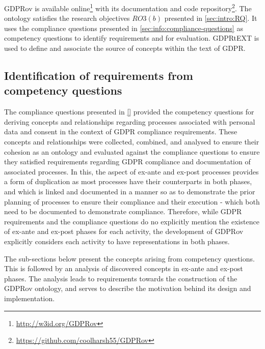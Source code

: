 GDPRov is available online\footnote{\url{http://w3id.org/GDPRov}} with its documentation and code repository\footnote{\url{https://github.com/coolharsh55/GDPRov}}.
The ontology satisfies the research objectives $RO3(b)$ presented in \autoref{sec:intro:RQ}.
It uses the compliance questions presented in \autoref{sec:info:compliance-questions} as competency questions to identify requirements and for evaluation.
GDPRtEXT is used to define and associate the source of concepts within the text of GDPR.

\subsection{Identification of requirements from competency questions}
The compliance questions presented in \autoref{} provided the competency questions for deriving concepts and relationships regarding processes associated with personal data and consent in the context of GDPR compliance requirements. 
These concepts and relationships were collected, combined, and analysed to ensure their cohesion as an ontology and evaluated against the compliance questions to ensure they satisfied requirements regarding GDPR compliance and documentation of associated processes.
In this, the aspect of ex-ante and ex-post processes provides a form of duplication as most processes have their counterparts in both phases, and which is linked and documented in a manner so as to demonstrate the prior planning of processes to ensure their compliance and their execution - which both need to be documented to demonstrate compliance.
Therefore, while GDPR requirements and the compliance questions do no explicitly mention the existence of ex-ante and ex-post phases for each activity, the development of GDPRov explicitly considers each activity to have representations in both phases.

The sub-sections below present the concepts arising from competency questions. 
This is followed by an analysis of discovered concepts in ex-ante and ex-post phases.
The analysis leads to requirements towards the construction of the GDPRov ontology, and serves to describe the motivation behind its design and implementation.


